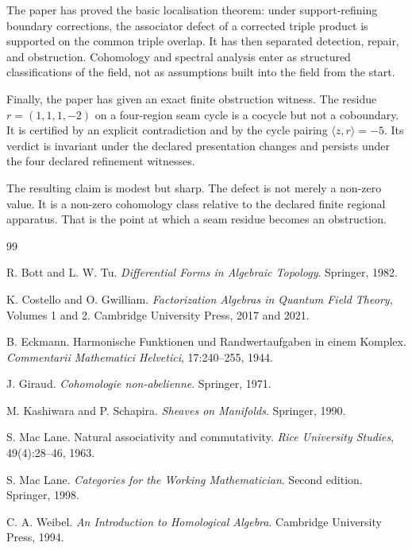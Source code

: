 \documentclass[11pt]{article}
\begin{document}
The paper has proved the basic localisation theorem: under support-refining boundary corrections, the associator defect of a corrected triple product is supported on the common triple overlap. It has then separated detection, repair, and obstruction. Cohomology and spectral analysis enter as structured classifications of the field, not as assumptions built into the field from the start.

Finally, the paper has given an exact finite obstruction witness. The residue \(r=(1,1,1,-2)\) on a four-region seam cycle is a cocycle but not a coboundary. It is certified by an explicit contradiction and by the cycle pairing \(\langle z,r\rangle=-5\). Its verdict is invariant under the declared presentation changes and persists under the four declared refinement witnesses.

The resulting claim is modest but sharp. The defect is not merely a non-zero value. It is a non-zero cohomology class relative to the declared finite regional apparatus. That is the point at which a seam residue becomes an obstruction.

\begin{thebibliography}{99}

R. Bott and L. W. Tu.
\newblock \emph{Differential Forms in Algebraic Topology}.
\newblock Springer, 1982.

K. Costello and O. Gwilliam.
\newblock \emph{Factorization Algebras in Quantum Field Theory}, Volumes 1 and 2.
\newblock Cambridge University Press, 2017 and 2021.

B. Eckmann.
\newblock Harmonische Funktionen und Randwertaufgaben in einem Komplex.
\newblock \emph{Commentarii Mathematici Helvetici}, 17:240--255, 1944.

J. Giraud.
\newblock \emph{Cohomologie non-abelienne}.
\newblock Springer, 1971.

M. Kashiwara and P. Schapira.
\newblock \emph{Sheaves on Manifolds}.
\newblock Springer, 1990.

S. Mac Lane.
\newblock Natural associativity and commutativity.
\newblock \emph{Rice University Studies}, 49(4):28--46, 1963.

S. Mac Lane.
\newblock \emph{Categories for the Working Mathematician}.
\newblock Second edition. Springer, 1998.

C. A. Weibel.
\newblock \emph{An Introduction to Homological Algebra}.
\newblock Cambridge University Press, 1994.

\end{thebibliography}
\end{document}

